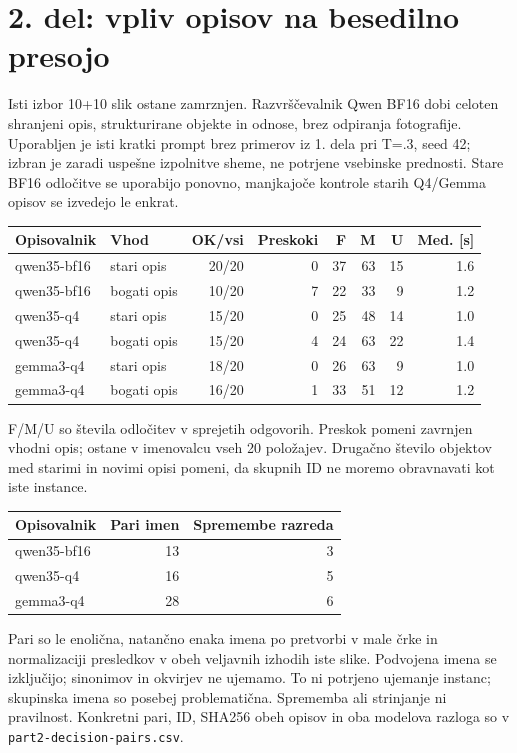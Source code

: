 \documentclass[10pt,a4paper]{article}
\begin{document}
\section*{2. del: vpliv opisov na besedilno presojo}
Isti izbor 10+10 slik ostane zamrznjen. Razvrščevalnik Qwen BF16 dobi celoten shranjeni opis, strukturirane objekte in odnose, brez odpiranja fotografije. Uporabljen je isti kratki prompt brez primerov iz 1. dela pri T=.3, seed 42; izbran je zaradi uspešne izpolnitve sheme, ne potrjene vsebinske prednosti. Stare BF16 odločitve se uporabijo ponovno, manjkajoče kontrole starih Q4/Gemma opisov se izvedejo le enkrat.
\begin{center}\small\begin{tabular}{llrrrrrr}\toprule
Opisovalnik & Vhod & OK/vsi & Preskoki & F & M & U & Med. [s] \\ \midrule
qwen35-bf16 & stari opis & 20/20 & 0 & 37 & 63 & 15 & 1.6 \\
qwen35-bf16 & bogati opis & 10/20 & 7 & 22 & 33 & 9 & 1.2 \\
qwen35-q4 & stari opis & 15/20 & 0 & 25 & 48 & 14 & 1.0 \\
qwen35-q4 & bogati opis & 15/20 & 4 & 24 & 63 & 22 & 1.4 \\
gemma3-q4 & stari opis & 18/20 & 0 & 26 & 63 & 9 & 1.0 \\
gemma3-q4 & bogati opis & 16/20 & 1 & 33 & 51 & 12 & 1.2 \\
\bottomrule\end{tabular}\end{center}

F/M/U so števila odločitev v sprejetih odgovorih. Preskok pomeni zavrnjen vhodni opis; ostane v imenovalcu vseh 20 položajev. Drugačno število objektov med starimi in novimi opisi pomeni, da skupnih ID ne moremo obravnavati kot iste instance.
\begin{center}\small\begin{tabular}{lrr}\toprule
Opisovalnik & Pari imen & Spremembe razreda \\ \midrule
qwen35-bf16 & 13 & 3 \\
qwen35-q4 & 16 & 5 \\
gemma3-q4 & 28 & 6 \\
\bottomrule\end{tabular}\end{center}

Pari so le enolična, natančno enaka imena po pretvorbi v male črke in normalizaciji presledkov v obeh veljavnih izhodih iste slike. Podvojena imena se izključijo; sinonimov in okvirjev ne ujemamo. To ni potrjeno ujemanje instanc; skupinska imena so posebej problematična. Sprememba ali strinjanje ni pravilnost. Konkretni pari, ID, SHA256 obeh opisov in oba modelova razloga so v \texttt{part2-decision-pairs.csv}.
\end{document}
